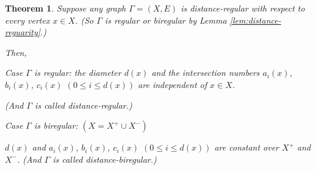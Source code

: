 \documentclass[
]{book}
\newtheorem{theorem}{Theorem}[chapter]
\theoremstyle{definition}
\theoremstyle{definition}
\theoremstyle{definition}
\theoremstyle{definition}
\theoremstyle{remark}
\begin{document}
\begin{theorem}
\protect\hypertarget{thm:distance-regular-x}{}\label{thm:distance-regular-x}Suppose any graph \(\Gamma = (X, E)\) is distance-regular with respect to every vertex \(x\in X\).
(So \(\Gamma\) is regular or biregular by Lemma \ref{lem:distance-reguarity}.)

Then,

Case \(\Gamma\) is regular: the diameter \(d(x)\) and the intersection numbers \(a_i(x)\), \(b_i(x)\), \(c_i(x)\) \((0\leq i\leq d(x))\) are independent of \(x\in X\).

(And \(\Gamma\) is called distance-regular.)

Case \(\Gamma\) is biregular: \((X = X^+\cup X^-)\)

\(d(x)\) and \(a_i(x)\), \(b_i(x)\), \(c_i(x)\) \((0\leq i\leq d(x))\) are constant over \(X^+\) and \(X^-\).
(And \(\Gamma\) is called distance-biregular.)
\end{theorem}
\end{document}
